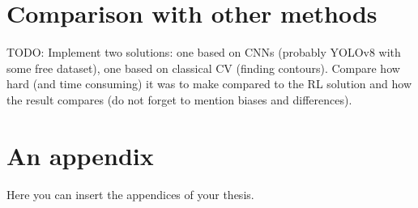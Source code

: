 \documentclass[
  digital,     %
  oneside,     %
  nosansbold,  %
  nocolorbold, %
  lof,         %
  lot,         %
]{fithesis4}
\begin{document}
\chapter{Comparison with other methods}
TODO: Implement two solutions: one based on CNNs (probably YOLOv8 with some free dataset), one based on classical CV (finding contours).
%
Compare how hard (and time consuming) it was to make compared to the RL solution and how the result compares (do not forget to mention biases and differences).


\printbibliography[heading=bibintoc] %


\appendix %
\chapter{An appendix}
Here you can insert the appendices of your thesis.
\end{document}
